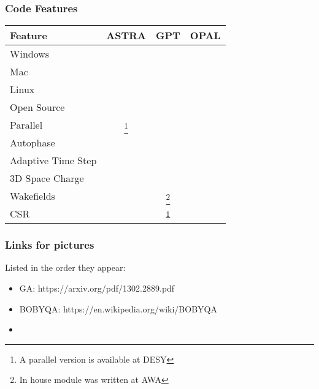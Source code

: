 \documentclass{beamer}
\newcommand{\cmark}{\ding{51}}%
\newcommand{\xmark}{\ding{55}}%
\begin{document}
\begin{frame}
	\frametitle{Code Features}
	\begin{table}
		\begin{minipage}{\textwidth}
			\begin{center}
				\setcounter{mpfootnote}{\value{footnote}}%
				\renewcommand{\thempfootnote}{\arabic{mpfootnote}}%
				\begin{tabular}{l c c c}
					\toprule
					\textbf{Feature} & \textbf{ASTRA} & \textbf{GPT} & \textbf{OPAL}\\
					\midrule
					Windows     		& \cmark & \cmark & \xmark \\ 
					Mac         		& \cmark & \cmark & \cmark \\
					Linux       		& \cmark & \cmark & \cmark \\
					Open Source 		& \xmark & \alert \xmark & \color{black!30!green}\cmark \\
					Parallel    		& \alert \xmark\footnote[1]{A parallel version is available at DESY} & \alert \xmark & \color{black!30!green}\cmark \\
					Autophase   		& \cmark & \xmark & \cmark \\
					Adaptive Time Step 	& \xmark & \cmark & \xmark \\
					3D Space Charge 	& \cmark & \cmark & \cmark \\
					Wakefields  		& \cmark & \xmark\footnote[2]{In house module was written at AWA\label{note2}} & \color{black!30!green}\cmark \\
					CSR         		& \alert \xmark & \xmark\textsuperscript{\ref{note2}} & \color{black!30!green}\cmark \\
					\bottomrule
				\end{tabular}
			\end{center}
		\end{minipage}
	\end{table}
	
\end{frame}

\begin{frame}
	\frametitle{Links for pictures}
	Listed in the order they appear:
	\begin{itemize}
		\item GA: https://arxiv.org/pdf/1302.2889.pdf
		\item BOBYQA: https://en.wikipedia.org/wiki/BOBYQA
		\item  
	\end{itemize}
\end{frame}
\end{document}
